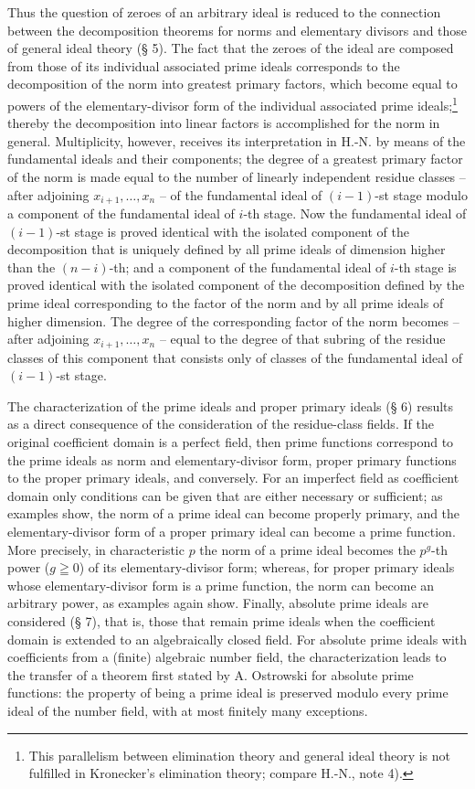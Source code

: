\documentclass[11pt]{article}
\begin{document}
Thus the question of zeroes of an arbitrary ideal is reduced to the connection between the decomposition theorems for norms and elementary divisors and those of general ideal theory (§ 5). The fact that the zeroes of the ideal are composed from those of its individual associated prime ideals corresponds to the decomposition of the norm into greatest primary factors, which become equal to powers of the elementary-divisor form of the individual associated prime ideals;\footnote{This parallelism between elimination theory and general ideal theory is not fulfilled in Kronecker's elimination theory; compare H.-N., note 4).} thereby the decomposition into linear factors is accomplished for the norm in general. Multiplicity, however, receives its interpretation in H.-N. by means of the fundamental ideals and their components; the degree of a greatest primary factor of the norm is made equal to the number of linearly independent residue classes -- after adjoining $x_{i+1},\ldots,x_n$ -- of the fundamental ideal of $(i-1)$-st stage modulo a component of the fundamental ideal of $i$-th stage. Now the fundamental ideal of $(i-1)$-st stage is proved identical with the isolated component of the decomposition that is uniquely defined by all prime ideals of dimension higher than the $(n-i)$-th; and a component of the fundamental ideal of $i$-th stage is proved identical with the isolated component of the decomposition defined by the prime ideal corresponding to the factor of the norm and by all prime ideals of higher dimension. The degree of the corresponding factor of the norm becomes -- after adjoining $x_{i+1},\ldots,x_n$ -- equal to the degree of that subring of the residue classes of this component that consists only of classes of the fundamental ideal of $(i-1)$-st stage.

The characterization of the prime ideals and proper primary ideals (§ 6) results as a direct consequence of the consideration of the residue-class fields. If the original coefficient domain is a perfect field, then prime functions correspond to the prime ideals as norm and elementary-divisor form, proper primary functions to the proper primary ideals, and conversely. For an imperfect field as coefficient domain only conditions can be given that are either necessary or sufficient; as examples show, the norm of a prime ideal can become properly primary, and the elementary-divisor form of a proper primary ideal can become a prime function. More precisely, in characteristic $p$ the norm of a prime ideal becomes the $p^g$-th power ($g\geqq0$) of its elementary-divisor form; whereas, for proper primary ideals whose elementary-divisor form is a prime function, the norm can become an arbitrary power, as examples again show. Finally, absolute prime ideals are considered (§ 7), that is, those that remain prime ideals when the coefficient domain is extended to an algebraically closed field. For absolute prime ideals with coefficients from a (finite) algebraic number field, the characterization leads to the transfer of a theorem first stated by A. Ostrowski for absolute prime functions: the property of being a prime ideal is preserved modulo every prime ideal of the number field, with at most finitely many exceptions.
\end{document}
